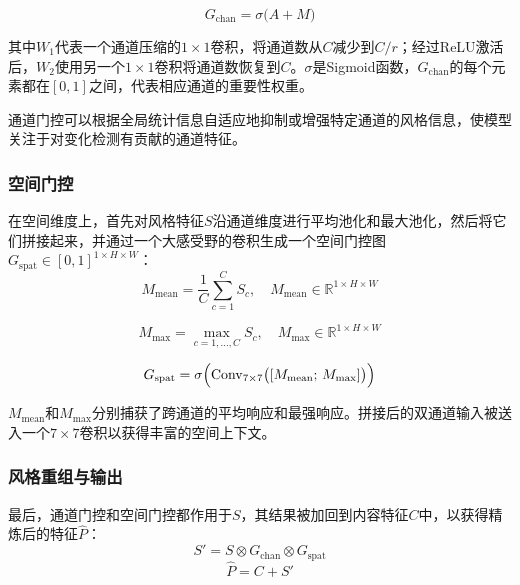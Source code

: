 \begin{equation}\label{eq:ccr_chan_gate}
G_{\mathrm{chan}} = \sigma\bigl(A + M\bigr)
\end{equation}

其中$W_1$代表一个通道压缩的$1\times1$卷积，将通道数从$C$减少到$C/r$；经过ReLU激活后，$W_2$使用另一个$1\times1$卷积将通道数恢复到$C$。$\sigma$是Sigmoid函数，$G_{\mathrm{chan}}$的每个元素都在$[0,1]$之间，代表相应通道的重要性权重。

通道门控可以根据全局统计信息自适应地抑制或增强特定通道的风格信息，使模型关注于对变化检测有贡献的通道特征。

\subsubsection{空间门控}
在空间维度上，首先对风格特征$S$沿通道维度进行平均池化和最大池化，然后将它们拼接起来，并通过一个大感受野的卷积生成一个空间门控图$G_{\mathrm{spat}}\in[0,1]^{1\times H\times W}$：
\begin{equation}\label{eq:ccr_spat_mean}
M_{\mathrm{mean}} = \frac{1}{C}\sum_{c=1}^{C} S_c,\quad M_{\mathrm{mean}}\in\mathbb{R}^{1\times H\times W}
\end{equation}

\begin{equation}\label{eq:ccr_spat_max}
M_{\mathrm{max}} = \max_{c=1,\dots,C} S_c,\quad M_{\mathrm{max}}\in\mathbb{R}^{1\times H\times W}
\end{equation}

\begin{equation}\label{eq:ccr_spat_gate}
G_{\mathrm{spat}} = \sigma\Bigl(\mathrm{Conv}_{7\times7}\bigl([M_{\mathrm{mean}};\,M_{\mathrm{max}}]\bigr)\Bigr)
\end{equation}

$M_{\mathrm{mean}}$和$M_{\mathrm{max}}$分别捕获了跨通道的平均响应和最强响应。拼接后的双通道输入被送入一个$7\times7$卷积以获得丰富的空间上下文。

\subsubsection{风格重组与输出}
最后，通道门控和空间门控都作用于$S$，其结果被加回到内容特征$C$中，以获得精炼后的特征$\hat P$：
\begin{equation}\label{eq:ccr_style_refine}
S' = S \otimes G_{\mathrm{chan}} \otimes G_{\mathrm{spat}}
\end{equation}
\begin{equation}\label{eq:ccr_output}
\hat P = C + S'
\end{equation}

